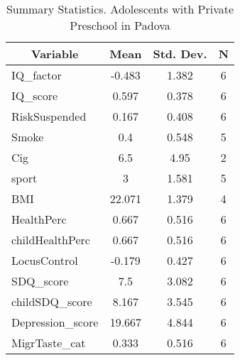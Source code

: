
\begin{table}[htbp]\centering \caption{Summary Statistics. Adolescents with Private Preschool in Padova \label{bothAdolmaternaPrivPadova}}
\begin{tabular}{l c c  c}\hline\hline
\multicolumn{1}{c}{\textbf{Variable}} & \textbf{Mean}
 & \textbf{Std. Dev.} & \textbf{N}\\ \hline
IQ\_factor & -0.483 & 1.382  & 6\\
IQ\_score & 0.597 & 0.378  & 6\\
RiskSuspended & 0.167 & 0.408  & 6\\
Smoke & 0.4 & 0.548  & 5\\
Cig & 6.5 & 4.95  & 2\\
sport & 3 & 1.581  & 5\\
BMI & 22.071 & 1.379  & 4\\
HealthPerc & 0.667 & 0.516  & 6\\
childHealthPerc & 0.667 & 0.516  & 6\\
LocusControl & -0.179 & 0.427  & 6\\
SDQ\_score & 7.5 & 3.082  & 6\\
childSDQ\_score & 8.167 & 3.545  & 6\\
Depression\_score & 19.667 & 4.844  & 6\\
MigrTaste\_cat & 0.333 & 0.516  & 6\\
\hline\end{tabular}
\end{table}
